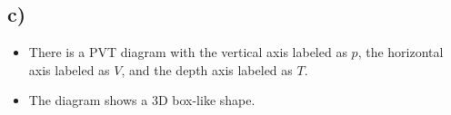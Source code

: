 

\subsection*{c)}

\begin{itemize}
    \item There is a PVT diagram with the vertical axis labeled as $p$, the horizontal axis labeled as $V$, and the depth axis labeled as $T$.
    \item The diagram shows a 3D box-like shape.
\end{itemize}